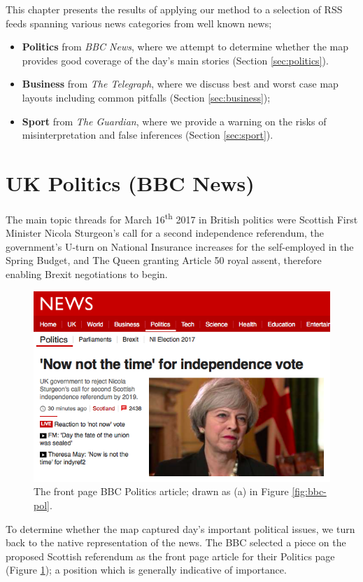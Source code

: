 This chapter presents the results of applying our method to a selection of RSS feeds spanning various news categories from well known news;
\begin{itemize}[noitemsep]
	\item \textbf{Politics} from \textit{BBC News}, where we attempt to determine whether the map provides good coverage of the day's main stories (Section \ref{sec:politics}).
	\item \textbf{Business} from \textit{The Telegraph}, where we discuss best and worst case map layouts including common pitfalls (Section \ref{sec:business});
	\item \textbf{Sport} from \textit{The Guardian}, where we provide a warning on the risks of misinterpretation and false inferences (Section \ref{sec:sport}).
\end{itemize}

\section{UK Politics (BBC News) \label{sec:politics}}

The main topic threads for March 16\textsuperscript{th} 2017 in British politics were Scottish First Minister Nicola Sturgeon's call for a second independence referendum, the government's U-turn on National Insurance increases for the self-employed in the Spring Budget, and The Queen granting Article 50 royal assent, therefore enabling Brexit negotiations to begin.

\begin{figure}[htbp!]
	\centering
	\includegraphics[width=.7\textwidth]{img/results/bbc-politics-frontpage.png}
	\caption{The front page BBC Politics article; drawn as (a) in Figure \ref{fig:bbc-pol}.}
	\label{fig:bbc-pol-home}
\end{figure}

To determine whether the map captured day's important political issues, we turn back to the native representation of the news. The BBC selected a piece on the proposed Scottish referendum as the front page article for their Politics page (Figure \ref{fig:bbc-pol-home}); a position which is generally indicative of importance.

